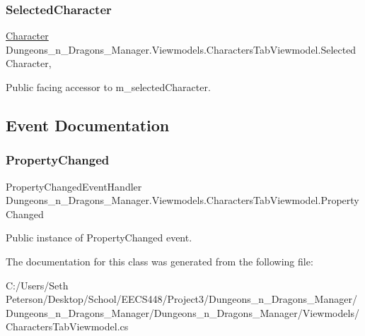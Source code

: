\subsubsection{\texorpdfstring{Selected\+Character}{SelectedCharacter}}
{\footnotesize\ttfamily \mbox{\hyperlink{class_dungeons__n___dragons___manager_1_1_models_1_1_character}{Character}} Dungeons\+\_\+n\+\_\+\+Dragons\+\_\+\+Manager.\+Viewmodels.\+Characters\+Tab\+Viewmodel.\+Selected\+Character\hspace{0.3cm}{\ttfamily [get]}, {\ttfamily [set]}}



Public facing accessor to m\+\_\+selected\+Character. 



\subsection{Event Documentation}
\mbox{\label{class_dungeons__n___dragons___manager_1_1_viewmodels_1_1_characters_tab_viewmodel_a6675b3bc821619ffe7f4ad20be8df240}} 
\subsubsection{\texorpdfstring{Property\+Changed}{PropertyChanged}}
{\footnotesize\ttfamily Property\+Changed\+Event\+Handler Dungeons\+\_\+n\+\_\+\+Dragons\+\_\+\+Manager.\+Viewmodels.\+Characters\+Tab\+Viewmodel.\+Property\+Changed}



Public instance of Property\+Changed event. 



The documentation for this class was generated from the following file\+:\begin{DoxyCompactItemize}
\item 
C\+:/\+Users/\+Seth Peterson/\+Desktop/\+School/\+E\+E\+C\+S448/\+Project3/\+Dungeons\+\_\+n\+\_\+\+Dragons\+\_\+\+Manager/\+Dungeons\+\_\+n\+\_\+\+Dragons\+\_\+\+Manager/\+Dungeons\+\_\+n\+\_\+\+Dragons\+\_\+\+Manager/\+Viewmodels/Characters\+Tab\+Viewmodel.\+cs\end{DoxyCompactItemize}
